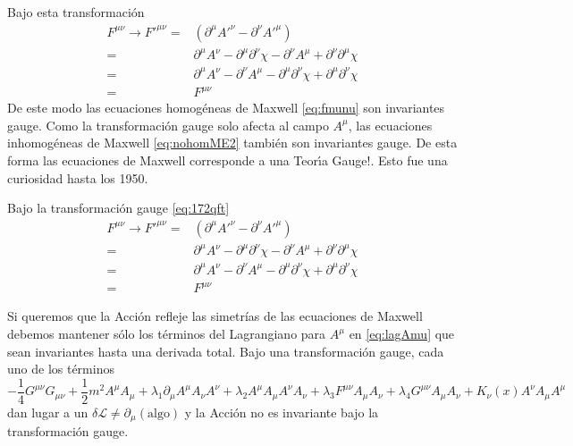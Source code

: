 Bajo esta transformaci\'on
\begin{align}
  \label{eq:fmunutrans}
  F^{\mu\nu}\to{F'}^{\mu\nu}=&(\partial^\mu{A'}^\nu-\partial^\nu{A'}^\mu)\nonumber\\
  =&\partial^\mu A^\nu-\partial^\mu\partial^\nu\chi-\partial^\nu A^\mu+\partial^\nu\partial^\mu\chi\nonumber\\
  =&\partial^\mu A^\nu-\partial^\nu A^\mu-\partial^\mu\partial^\nu\chi+\partial^\mu\partial^\nu\chi\nonumber\\
  =&F^{\mu\nu}
\end{align}
De este modo las ecuaciones homog\'eneas de Maxwell \eqref{eq:fmunu} son invariantes gauge. Como la transformaci\'on gauge solo afecta al campo $A^\mu$, las ecuaciones inhomog\'eneas de Maxwell \eqref{eq:nohomME2} tambi\'en son invariantes gauge. 
De esta forma las ecuaciones de Maxwell corresponde a una Teor\'\i a Gauge!. Esto fue una curiosidad hasta los 1950. 




\begin{frame}
Bajo la transformación gauge \eqref{eq:172qft}
\begin{align}
  \label{eq:fmunutrans}
  F^{\mu\nu}\to{F'}^{\mu\nu}=&(\partial^\mu{A'}^\nu-\partial^\nu{A'}^\mu)\nonumber\\
  =&\partial^\mu A^\nu-\partial^\mu\partial^\nu\chi-\partial^\nu A^\mu+\partial^\nu\partial^\mu\chi\nonumber\\
  =&\partial^\mu A^\nu-\partial^\nu A^\mu-\partial^\mu\partial^\nu\chi+\partial^\mu\partial^\nu\chi\nonumber\\
  =&F^{\mu\nu}
\end{align}

Si queremos que la Acción refleje las simetrías de las ecuaciones de
Maxwell debemos mantener sólo los términos del Lagrangiano para $A^\mu$
en \eqref{eq:lagAmu} que sean invariantes hasta una derivada total. Bajo una transformación gauge, cada
uno de los términos
\begin{equation*}
  -\frac{1}{4}G^{\mu\nu}G_{\mu\nu}+
  \frac{1}{2}m^2A^\mu A_\mu+\lambda_1\partial_\mu A^\mu A_\nu A^\nu+\lambda_2 A^\mu A_\mu A^\nu A_\nu+\lambda_3F^{\mu\nu}A_\mu A_\nu+\lambda_4G^{\mu\nu}A_\mu A_\nu
+K_\nu(x) A^\nu A_\mu A^\mu
\end{equation*}
dan lugar a un $\delta\mathcal{L}\neq\partial_\mu(\text{algo})$ y la Acción no es
invariante bajo la transformación gauge.

\end{frame}




